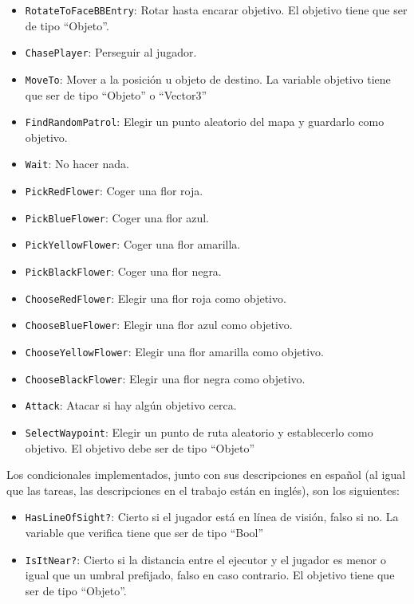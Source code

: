 \begin{itemize}
  \item \texttt{RotateToFaceBBEntry}: Rotar hasta encarar objetivo. El objetivo tiene que ser de tipo ``Objeto''.
  \item \texttt{ChasePlayer}: Perseguir al jugador.
  \item \texttt{MoveTo}: Mover a la posición u objeto de destino. La variable objetivo tiene que ser de tipo ``Objeto'' o ``Vector3''
  \item \texttt{FindRandomPatrol}: Elegir un punto aleatorio del mapa y guardarlo como objetivo.
  \item \texttt{Wait}: No hacer nada.
  \item \texttt{PickRedFlower}: Coger una flor roja.
  \item \texttt{PickBlueFlower}: Coger una flor azul.
  \item \texttt{PickYellowFlower}: Coger una flor amarilla.
  \item \texttt{PickBlackFlower}: Coger una flor negra.
  \item \texttt{ChooseRedFlower}: Elegir una flor roja como objetivo.
  \item \texttt{ChooseBlueFlower}: Elegir una flor azul como objetivo.
  \item \texttt{ChooseYellowFlower}: Elegir una flor amarilla como objetivo.
  \item \texttt{ChooseBlackFlower}: Elegir una flor negra como objetivo.
  \item \texttt{Attack}: Atacar si hay algún objetivo cerca.
  \item \texttt{SelectWaypoint}: Elegir un punto de ruta aleatorio y establecerlo como objetivo. El objetivo debe ser de tipo ``Objeto''
\end{itemize}

Los condicionales implementados, junto con sus descripciones en español (al igual que las tareas, las descripciones en el trabajo están en inglés), son los siguientes:

\begin{itemize}
  \item \texttt{HasLineOfSight?}: Cierto si el jugador está en línea de visión, falso si no. La variable que verifica tiene que ser de tipo ``Bool''
  \item \texttt{IsItNear?}: Cierto si la distancia entre el ejecutor y el jugador es menor o igual que un umbral prefijado, falso en caso contrario. El objetivo tiene que ser de tipo ``Objeto''.
\end{itemize}

